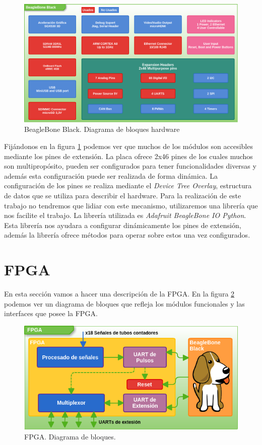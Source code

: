 	\begin{figure}[h]
		\centering
		\includegraphics[keepaspectratio, width=1\textwidth]{./img/beaglebone.png}
		\caption{BeagleBone Black. Diagrama de bloques hardware}
		\label{fig:beaglebone}
	\end{figure}
	Fijándonos en la figura \ref{fig:beaglebone} podemos ver que muchos de los módulos son accesibles mediante los pines de
	extensión\cite{BeagleWikiExp}. La placa ofrece 2x46 pines de los cuales muchos son multipropósito, pueden ser configurados para tener
	funcionalidades diversas y además esta configuración puede ser realizada de forma dinámica. La configuración de los pines se realiza mediante
	el \emph{Device Tree Overlay}, estructura de datos que se utiliza para describir el hardware. Para la realización de este trabajo no tendremos
	que lidiar con este mecanismo, utilizaremos una librería que nos facilite el trabajo. La librería utilizada es \emph{Adafruit BeagleBone IO
	Python}\cite{AdaFruitGit}. Esta librería nos ayudara a configurar dinámicamente los pines de extensión, además la librería ofrece métodos para
	operar sobre estos una vez configurados.

\section{FPGA}
	En esta sección vamos a hacer una descripción de la FPGA. En la figura \ref{fig:fpga} podemos ver un diagrama de bloques que refleja los
	módulos funcionales y las interfaces que posee la FPGA.
	\begin{figure}[h]
		\centering
		\includegraphics[keepaspectratio, width=1\textwidth]{./img/fpga.png}
		\caption{FPGA. Diagrama de bloques.}
		\label{fig:fpga}
	\end{figure}	
